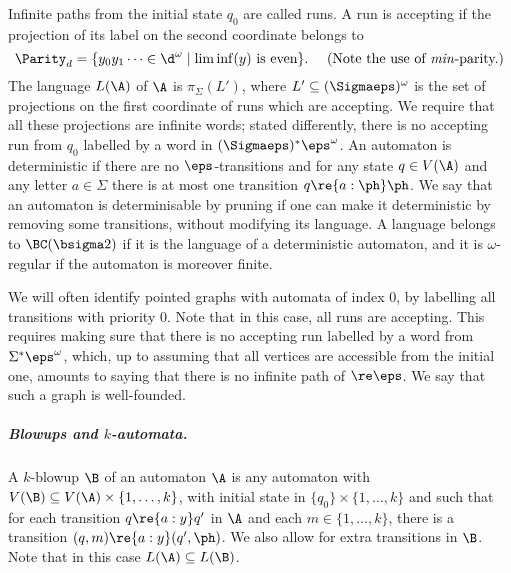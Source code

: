 Infinite paths from the initial state $q_0$ are called runs. A run is accepting if the projection of its label on the second coordinate belongs to
\[
    \Parity_d = \{y_0y_1 \dots \in \d^\omega \mid \liminf(y) \text{ is even}\}. \quad \text{ (Note the use of \emph{min}-parity.)}
\]
The language $L(\A)$ of $\A$ is $\pi_\Sigma(L')$, where $L' \subseteq (\Sigmaeps)^\omega$ is the set of projections on the first coordinate of runs which are accepting.
We require that all these projections are infinite words; stated differently, there is no accepting run from $q_0$ labelled by a word in $(\Sigmaeps)^* \eps^\omega$.
An automaton is deterministic if there are no $\eps$-transitions and for any state $q \in V(\A)$ and any letter $a \in \Sigma$ there is at most one transition $q \re{a:\ph} \ph$.
We say that an automaton is determinisable by pruning if one can make it deterministic by removing some transitions, without modifying its language.
A language belongs to $\BC(\bsigma 2)$ if it is the language of a deterministic automaton, and it is $\omega$-regular if the automaton is moreover finite.



We will often identify pointed graphs with automata of index $0$, by labelling all transitions with priority $0$. Note that in this case, all runs are accepting.
This requires making sure that there is no accepting run labelled by a word from $\Sigma^* \eps^\omega$, which, up to assuming that all vertices are accessible from the initial one, amounts to saying that there is no infinite path of $\re \eps$.
We say that such a graph is well-founded.


\subparagraph*{Blowups and $k$-automata.} A $k$-blowup $\B$ of an automaton $\A$ is any automaton with $V(\B) \subseteq V(\A) \times \{1,\dots, k\}$, with initial state in $\{q_0\}\times\{1,\dots,k\}$ and such that for each transition $q \re{a:y} q'$ in $\A$ and each $m \in \{1,\dots,k\}$, there is a transition $(q,m) \re{a:y} (q',\ph)$. We also allow for extra transitions in $\B$. %
Note that in this case $L(\A) \subseteq L(\B)$.

